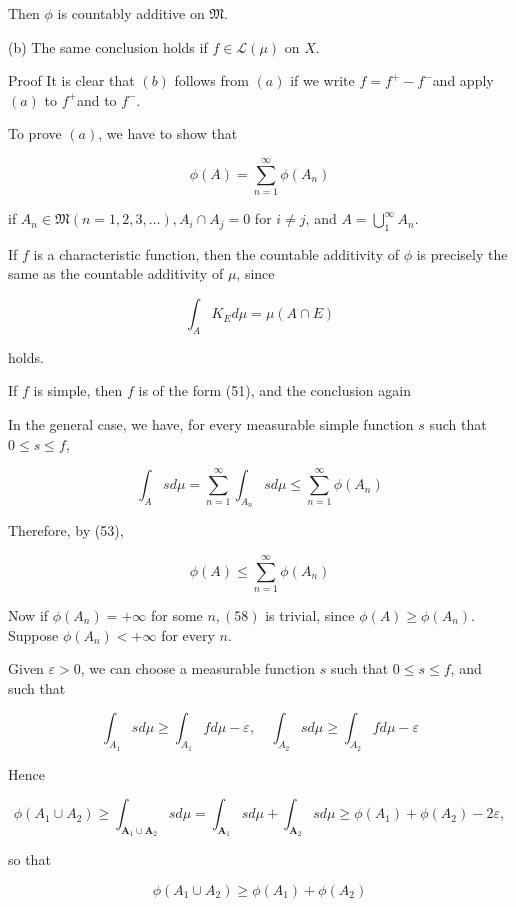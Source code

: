 \documentclass[10pt]{article}
\begin{document}
Then $\phi$ is countably additive on $\mathfrak{M}$.

(b) The same conclusion holds if $f \in \mathscr{L}(\mu)$ on $X$.

Proof It is clear that $(b)$ follows from $(a)$ if we write $f=f^{+}-f^{-}$and apply $(a)$ to $f^{+}$and to $f^{-}$.

To prove $(a)$, we have to show that

$$
\phi(A)=\sum_{n=1}^{\infty} \phi\left(A_{n}\right)
$$

if $A_{n} \in \mathfrak{M}(n=1,2,3, \ldots), A_{i} \cap A_{j}=0$ for $i \neq j$, and $A=\bigcup_{1}^{\infty} A_{n}$.

If $f$ is a characteristic function, then the countable additivity of $\phi$ is precisely the same as the countable additivity of $\mu$, since

$$
\int_{A} K_{E} d \mu=\mu(A \cap E)
$$

holds.

If $f$ is simple, then $f$ is of the form (51), and the conclusion again

In the general case, we have, for every measurable simple function $s$ such that $0 \leq s \leq f$,

$$
\int_{A} s d \mu=\sum_{n=1}^{\infty} \int_{A_{n}} s d \mu \leq \sum_{n=1}^{\infty} \phi\left(A_{n}\right)
$$

Therefore, by (53),

$$
\phi(A) \leq \sum_{n=1}^{\infty} \phi\left(A_{n}\right)
$$

Now if $\phi\left(A_{n}\right)=+\infty$ for some $n,(58)$ is trivial, since $\phi(A) \geq \phi\left(A_{n}\right)$. Suppose $\phi\left(A_{n}\right)<+\infty$ for every $n$.

Given $\varepsilon>0$, we can choose a measurable function $s$ such that $0 \leq s \leq f$, and such that

$$
\int_{A_{1}} s d \mu \geq \int_{A_{1}} f d \mu-\varepsilon, \quad \int_{A_{2}} s d \mu \geq \int_{A_{2}} f d \mu-\varepsilon
$$

Hence

$$
\phi\left(A_{1} \cup A_{2}\right) \geq \int_{\boldsymbol{A}_{1} \cup \boldsymbol{A}_{2}} s d \mu=\int_{\boldsymbol{A}_{1}} s d \mu+\int_{\boldsymbol{A}_{2}} s d \mu \geq \phi\left(A_{1}\right)+\phi\left(A_{2}\right)-2 \varepsilon,
$$

so that

$$
\phi\left(A_{1} \cup A_{2}\right) \geq \phi\left(A_{1}\right)+\phi\left(A_{2}\right)
$$
\end{document}
